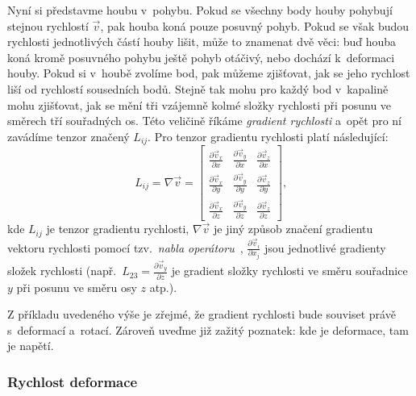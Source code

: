 \documentclass[12pt]{article}
\begin{document}
Nyní si představme houbu v~pohybu. Pokud se všechny body houby pohybují stejnou rychlostí $\vec v$, pak houba koná pouze posuvný pohyb. Pokud se však budou rychlosti jednotlivých částí houby lišit, může to znamenat dvě věci: buď houba koná kromě posuvného pohybu ještě pohyb otáčivý, nebo dochází k~deformaci houby. Pokud si v~houbě zvolíme bod, pak můžeme zjišťovat, jak se jeho rychlost liší od rychlostí sousedních bodů. Stejně tak mohu pro každý bod v~kapalině mohu zjišťovat, jak se mění tři vzájemně kolmé složky rychlosti při posunu ve směrech tří souřadných os. Této veličině říkáme \emph{gradient rychlosti} a~opět pro ní zavádíme tenzor značený $L_{ij}$. Pro tenzor gradientu rychlosti platí následující:
\begin{equation}
    L_{ij} = \nabla\vec v =
    \begin{bmatrix}
        \frac{\partial \vec{v}_x}{\partial x} & \frac{\partial \vec{v}_y}{\partial x} & \frac{\partial \vec{v}_z}{\partial x}\\
        \frac{\partial \vec{v}_x}{\partial y} & \frac{\partial \vec{v}_y}{\partial y} & \frac{\partial \vec{v}_z}{\partial y}\\
        \frac{\partial \vec{v}_x}{\partial z} & \frac{\partial \vec{v}_y}{\partial z} & \frac{\partial \vec{v}_z}{\partial z}
    \end{bmatrix}
    \text{,}
    \label{eq:tenzor_grad_rychlosti}
\end{equation}
kde $L_{ij}$ je tenzor gradientu rychlosti, $\nabla\vec v$ je jiný způsob značení gradientu vektoru rychlosti pomocí tzv.~\emph{nabla operátoru}~\cite{wiki:Nabla}, $\frac{\partial \vec{v}_i}{\partial x_j}$ jsou jednotlivé gradienty složek rychlosti (např.~$L_{23} = \frac{\partial \vec{v}_y}{\partial z}$ je gradient složky rychlosti ve směru souřadnice $y$ při posunu ve směru osy $z$ atp.).~\cite{wiki:Strain_rate_tensor}
\par
Z příkladu uvedeného výše je zřejmé, že gradient rychlosti bude souviset právě s~deformací a~rotací. Zároveň uveďme již zažitý poznatek: kde je deformace, tam je napětí.

\subsubsection{Rychlost deformace}%
\end{document}
